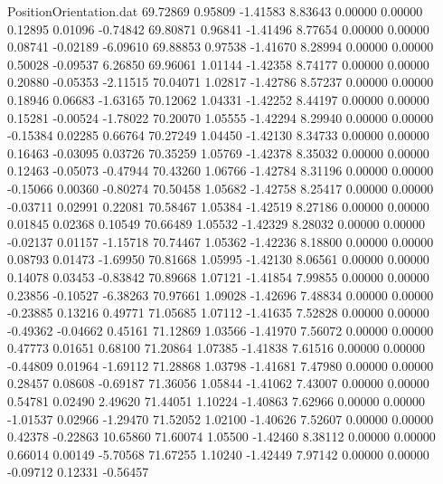 \begin{filecontents}{PositionOrientation.dat}
  69.72869    0.95809   -1.41583     8.83643    0.00000    0.00000    0.12895    0.01096   -0.74842
  69.80871    0.96841   -1.41496     8.77654    0.00000    0.00000    0.08741   -0.02189   -6.09610
  69.88853    0.97538   -1.41670     8.28994    0.00000    0.00000    0.50028   -0.09537    6.26850
  69.96061    1.01144   -1.42358     8.74177    0.00000    0.00000    0.20880   -0.05353   -2.11515
  70.04071    1.02817   -1.42786     8.57237    0.00000    0.00000    0.18946    0.06683   -1.63165
  70.12062    1.04331   -1.42252     8.44197    0.00000    0.00000    0.15281   -0.00524   -1.78022
  70.20070    1.05555   -1.42294     8.29940    0.00000    0.00000   -0.15384    0.02285    0.66764
  70.27249    1.04450   -1.42130     8.34733    0.00000    0.00000    0.16463   -0.03095    0.03726
  70.35259    1.05769   -1.42378     8.35032    0.00000    0.00000    0.12463   -0.05073   -0.47944
  70.43260    1.06766   -1.42784     8.31196    0.00000    0.00000   -0.15066    0.00360   -0.80274
  70.50458    1.05682   -1.42758     8.25417    0.00000    0.00000   -0.03711    0.02991    0.22081
  70.58467    1.05384   -1.42519     8.27186    0.00000    0.00000    0.01845    0.02368    0.10549
  70.66489    1.05532   -1.42329     8.28032    0.00000    0.00000   -0.02137    0.01157   -1.15718
  70.74467    1.05362   -1.42236     8.18800    0.00000    0.00000    0.08793    0.01473   -1.69950
  70.81668    1.05995   -1.42130     8.06561    0.00000    0.00000    0.14078    0.03453   -0.83842
  70.89668    1.07121   -1.41854     7.99855    0.00000    0.00000    0.23856   -0.10527   -6.38263
  70.97661    1.09028   -1.42696     7.48834    0.00000    0.00000   -0.23885    0.13216    0.49771
  71.05685    1.07112   -1.41635     7.52828    0.00000    0.00000   -0.49362   -0.04662    0.45161
  71.12869    1.03566   -1.41970     7.56072    0.00000    0.00000    0.47773    0.01651    0.68100
  71.20864    1.07385   -1.41838     7.61516    0.00000    0.00000   -0.44809    0.01964   -1.69112
  71.28868    1.03798   -1.41681     7.47980    0.00000    0.00000    0.28457    0.08608   -0.69187
  71.36056    1.05844   -1.41062     7.43007    0.00000    0.00000    0.54781    0.02490    2.49620
  71.44051    1.10224   -1.40863     7.62966    0.00000    0.00000   -1.01537    0.02966   -1.29470
  71.52052    1.02100   -1.40626     7.52607    0.00000    0.00000    0.42378   -0.22863   10.65860
  71.60074    1.05500   -1.42460     8.38112    0.00000    0.00000    0.66014    0.00149   -5.70568
  71.67255    1.10240   -1.42449     7.97142    0.00000    0.00000   -0.09712    0.12331   -0.56457

\end{filecontents}
